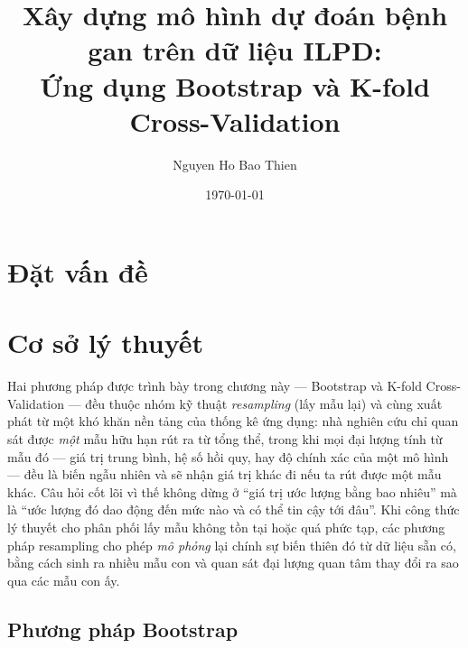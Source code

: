 \documentclass[14pt,a4paper]{extarticle}\usepackage[]{graphicx}\usepackage[]{xcolor}
\title{Xây dựng mô hình dự đoán bệnh gan trên dữ liệu ILPD:\\
Ứng dụng Bootstrap và K-fold Cross-Validation}
\author{Nguyen Ho Bao Thien}
\date{\today}
\begin{document}
\maketitle
\tableofcontents
\newpage



\section{Đặt vấn đề}


\section{Cơ sở lý thuyết}

Hai phương pháp được trình bày trong chương này --- Bootstrap và K-fold
Cross-Validation --- đều thuộc nhóm kỹ thuật \emph{resampling} (lấy mẫu
lại) và cùng xuất phát từ một khó khăn nền tảng của thống kê ứng dụng:
nhà nghiên cứu chỉ quan sát được \emph{một} mẫu hữu hạn rút ra từ tổng
thể, trong khi mọi đại lượng tính từ mẫu đó --- giá trị trung bình, hệ số
hồi quy, hay độ chính xác của một mô hình --- đều là biến ngẫu nhiên và
sẽ nhận giá trị khác đi nếu ta rút được một mẫu khác. Câu hỏi cốt lõi vì
thế không dừng ở ``giá trị ước lượng bằng bao nhiêu'' mà là ``ước lượng
đó dao động đến mức nào và có thể tin cậy tới đâu''. Khi công thức lý
thuyết cho phân phối lấy mẫu không tồn tại hoặc quá phức tạp, các phương
pháp resampling cho phép \emph{mô phỏng} lại chính sự biến thiên đó từ dữ
liệu sẵn có, bằng cách sinh ra nhiều mẫu con và quan sát đại lượng quan
tâm thay đổi ra sao qua các mẫu con ấy.

\subsection{Phương pháp Bootstrap}
\end{document}
